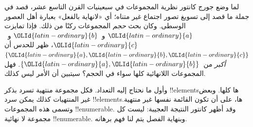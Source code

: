 \documentclass[../../../include/open-logic-section]{subfiles}
\begin{document}


لما وضع جورج كانتور نظرية المجموعات في سبعينيات القرن التاسع عشر،
قصد في جملة ما قصد إلى تسويغ تصور اجتماع غير متناه؛ أي «لانهاية
بالفعل» بعبارة أهل العصور الوسطى. وكان بحث \emph{حجم} المجموعات
ركنًا من ذلك. فإذا تمايزت $\OLId{latin-ordinary}{a}$ و~$\OLId{latin-ordinary}{b}$ و~$\OLId{latin-ordinary}{c}$، ظهر للحدس أن
$\{\OLId{latin-ordinary}{a}, \OLId{latin-ordinary}{b}, \OLId{latin-ordinary}{c}\}$ \emph{أكبر} من~$\{\OLId{latin-ordinary}{a}, \OLId{latin-ordinary}{b}\}$. فهل المجموعات
اللانهائية كلها سواء في الحجم؟ سيتبين أن الأمر ليس كذلك.

وأول ما نحتاج إليه التعداد. فكل مجموعة منتهية تسرد بذكر
!!{element}sها كلها. وبعض غير المنتهيات كذلك يمكن سرد
!!{element}sها، على أن تكون القائمة نفسها غير منتهية. وتسمى هذه المجموعات !!{enumerable}. وقد أظهر كانتور النتيجة العجيبة: ليست كل
مجموعة لا نهائية !!{enumerable}. وبنهاية الفصل يتم لنا فهم برهانه.
\end{document}
